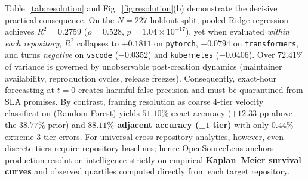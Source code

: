 \documentclass[conference]{IEEEtran}
\begin{document}
\begin{table}[t]
\centering
\caption{Creation-Time ($t=0$) Resolution Prediction Benchmarks ($N=227$ Holdout, 28 Leakage-Free Predictors)}
\label{tab:resolution}
\setlength{\tabcolsep}{3.2pt}
\end{table}

Table~\ref{tab:resolution} and Fig.~\ref{fig:resolution}(b) demonstrate the decisive practical consequence. On the $N=227$ holdout split, pooled Ridge regression achieves $R^2 = 0.2759$ ($\rho = 0.528$, $p = 1.04 \times 10^{-17}$), yet when evaluated \emph{within each repository}, $R^2$ collapses to $+0.1811$ on \texttt{pytorch}, $+0.0794$ on \texttt{transformers}, and turns \emph{negative} on \texttt{vscode} ($-0.0352$) and \texttt{kubernetes} ($-0.0406$). Over \textbf{$72.41\%$} of variance is governed by unobservable post-creation dynamics (maintainer availability, reproduction cycles, release freezes). Consequently, exact-hour forecasting at $t=0$ creates harmful false precision and must be quarantined from SLA promises. By contrast, framing resolution as coarse 4-tier velocity classification (Random Forest) yields $51.10\%$ exact accuracy ($+12.33$ pp above the $38.77\%$ prior) and \textbf{$88.11\%$ adjacent accuracy ($\pm 1$ tier)} with only $0.44\%$ extreme 3-tier errors. For universal cross-repository analytics, however, even discrete tiers require repository baselines; hence OpenSourceLens anchors production resolution intelligence strictly on empirical \textbf{Kaplan--Meier survival curves} and observed quartiles computed directly from each target repository.
\end{document}
